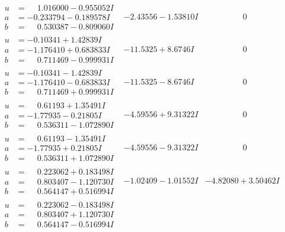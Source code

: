 \documentclass[1p]{elsarticle_modified}
\theoremstyle{definition}
\begin{document}
$$\begin{array}{c|c|c}
\begin{aligned}
u &= \phantom{-}1.016000 - 0.955052 I \\
a &= -0.233794 - 0.189578 I \\
b &= \phantom{-}0.530387 - 0.809060 I\end{aligned}
 & -2.43556 - 1.53810 I & \phantom{-0.000000 } 0 \\ \hline\begin{aligned}
u &= -0.10341 + 1.42839 I \\
a &= -1.176410 + 0.683833 I \\
b &= \phantom{-}0.711469 - 0.999931 I\end{aligned}
 & -11.5325 + 8.6746 I & \phantom{-0.000000 } 0 \\ \hline\begin{aligned}
u &= -0.10341 - 1.42839 I \\
a &= -1.176410 - 0.683833 I \\
b &= \phantom{-}0.711469 + 0.999931 I\end{aligned}
 & -11.5325 - 8.6746 I & \phantom{-0.000000 } 0 \\ \hline\begin{aligned}
u &= \phantom{-}0.61193 + 1.35491 I \\
a &= -1.77935 - 0.21805 I \\
b &= \phantom{-}0.536311 - 1.072890 I\end{aligned}
 & -4.59556 + 9.31322 I & \phantom{-0.000000 } 0 \\ \hline\begin{aligned}
u &= \phantom{-}0.61193 - 1.35491 I \\
a &= -1.77935 + 0.21805 I \\
b &= \phantom{-}0.536311 + 1.072890 I\end{aligned}
 & -4.59556 - 9.31322 I & \phantom{-0.000000 } 0 \\ \hline\begin{aligned}
u &= \phantom{-}0.223062 + 0.183498 I \\
a &= \phantom{-}0.803407 - 1.120730 I \\
b &= \phantom{-}0.564147 + 0.516994 I\end{aligned}
 & -1.02409 - 1.01552 I & -4.82080 + 3.50462 I \\ \hline\begin{aligned}
u &= \phantom{-}0.223062 - 0.183498 I \\
a &= \phantom{-}0.803407 + 1.120730 I \\
b &= \phantom{-}0.564147 - 0.516994 I\end{aligned}

\end{array}$$
\end{document}
